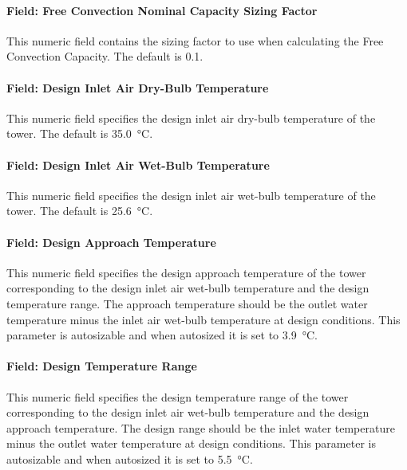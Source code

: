 \paragraph{Field: Free Convection Nominal Capacity Sizing Factor}\label{field-free-convection-nominal-capacity-sizing-factor}

This numeric field contains the sizing factor to use when calculating the Free Convection Capacity. The default is 0.1.

\paragraph{Field: Design Inlet Air Dry-Bulb Temperature}\label{field-design-inlet-air-drybulb-temperature}

This numeric field specifies the design inlet air dry-bulb temperature of the tower. The default is \SI{35.0}{\celsius}.

\paragraph{Field: Design Inlet Air Wet-Bulb Temperature}\label{field-design-inlet-air-wetbulb-temperature}

This numeric field specifies the design inlet air wet-bulb temperature of the tower. The default is \SI{25.6}{\celsius}.

\paragraph{Field: Design Approach Temperature}

This numeric field specifies the design approach temperature of the tower corresponding to the design inlet air wet-bulb temperature and the design temperature range.
The approach temperature should be the outlet water temperature minus the inlet air wet-bulb temperature at design conditions.
This parameter is autosizable and when autosized it is set to \SI{3.9}{\celsius}.

\paragraph{Field: Design Temperature Range}\label{field-design-temperature-range}

This numeric field specifies the design temperature range of the tower corresponding to the design inlet air wet-bulb temperature and the design approach temperature.
The design range  should be the inlet water temperature minus the outlet water temperature at design conditions.
This parameter is autosizable and when autosized it is set to \SI{5.5}{\celsius}.

